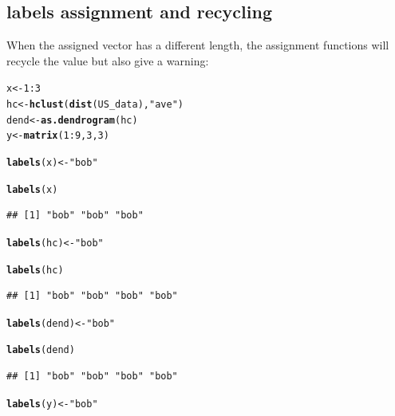 \documentclass[shortnames,nojss,article]{jss}\usepackage{graphicx, color}
\makeatletter
\newcommand{\hlfunctioncall}[1]{\textcolor[rgb]{0.501960784313725,0,0.329411764705882}{\textbf{#1}}}%
\newcommand{\hlstring}[1]{\textcolor[rgb]{0.6,0.6,1}{#1}}%
\newenvironment{kframe}{%
 \def\at@end@of@kframe{}%
 \ifinner\ifhmode%
  \def\at@end@of@kframe{\end{minipage}}%
  \begin{minipage}{\columnwidth}%
 \fi\fi%
 \def\FrameCommand##1{\hskip\@totalleftmargin \hskip-\fboxsep
 \colorbox{shadecolor}{##1}\hskip-\fboxsep
     \hskip-\linewidth \hskip-\@totalleftmargin \hskip\columnwidth}%
 \MakeFramed {\advance\hsize-\width
   \@totalleftmargin\z@ \linewidth\hsize
   \@setminipage}}%
 {\par\unskip\endMakeFramed%
 \at@end@of@kframe}
\newenvironment{knitrout}{}{} %
\makeatother
\begin{document}
\subsection{labels assignment and recycling}

When the assigned vector has a different length, the  assignment functions will recycle the value but also give a warning:

\begin{knitrout}
\color{fgcolor}\begin{kframe}
\begin{alltt}

x <- 1:3
hc <- \hlfunctioncall{hclust}(\hlfunctioncall{dist}(US_data), \hlstring{"ave"})
dend <- \hlfunctioncall{as.dendrogram}(hc)
y <- \hlfunctioncall{matrix}(1:9, 3, 3)

\hlfunctioncall{labels}(x) <- \hlstring{"bob"}
\end{alltt}


{\ttfamily\noindent\color{warningcolor}{\#\# Warning: The lengths of the new labels is shorter than the length of the object - labels are recycled.}}\begin{alltt}
\hlfunctioncall{labels}(x)
\end{alltt}
\begin{verbatim}
## [1] "bob" "bob" "bob"
\end{verbatim}
\begin{alltt}
\hlfunctioncall{labels}(hc) <- \hlstring{"bob"}
\end{alltt}


{\ttfamily\noindent\color{warningcolor}{\#\# Warning: The lengths of the new labels is shorter than the number of leaves in the hclust - labels are recycled.}}\begin{alltt}
\hlfunctioncall{labels}(hc)
\end{alltt}
\begin{verbatim}
## [1] "bob" "bob" "bob" "bob"
\end{verbatim}
\begin{alltt}
\hlfunctioncall{labels}(dend) <- \hlstring{"bob"}
\end{alltt}


{\ttfamily\noindent\color{warningcolor}{\#\# Warning: The lengths of the new labels is shorter than the number of leaves in the dendrogram - labels are recycled.}}\begin{alltt}
\hlfunctioncall{labels}(dend)
\end{alltt}
\begin{verbatim}
## [1] "bob" "bob" "bob" "bob"
\end{verbatim}
\begin{alltt}
\hlfunctioncall{labels}(y) <- \hlstring{"bob"}
\end{alltt}



\end{kframe}
\end{knitrout}
\end{document}
